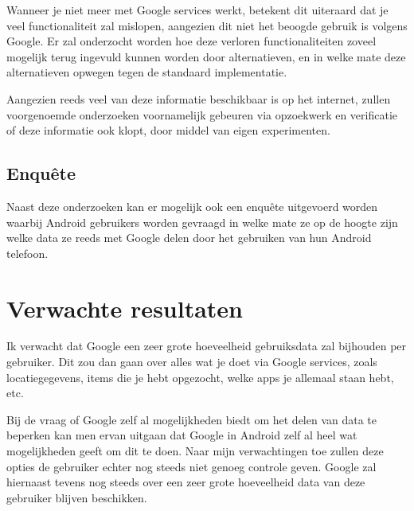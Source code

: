 \vspace{3mm}

\noindent Wanneer je niet meer met Google services werkt, betekent dit uiteraard dat je veel functionaliteit zal mislopen, aangezien dit niet het beoogde gebruik is volgens Google. Er zal onderzocht worden hoe deze verloren functionaliteiten zoveel mogelijk terug ingevuld kunnen worden door alternatieven, en in welke mate deze alternatieven opwegen tegen de standaard implementatie.

\vspace{3mm}

\noindent Aangezien reeds veel van deze informatie beschikbaar is op het internet, zullen voorgenoemde onderzoeken voornamelijk gebeuren via opzoekwerk en verificatie of deze informatie ook klopt, door middel van eigen experimenten.

\subsection{{Enquête}}

\noindent Naast deze onderzoeken kan er mogelijk ook een enquête uitgevoerd worden waarbij Android gebruikers worden gevraagd in welke mate ze op de hoogte zijn welke data ze reeds met Google delen door het gebruiken van hun Android telefoon.

\section{Verwachte resultaten}
\label{sec:verwachte_resultaten}

Ik verwacht dat Google een zeer grote hoeveelheid gebruiksdata zal bijhouden per gebruiker. Dit zou dan gaan over alles wat je doet via Google services, zoals locatiegegevens, items die je hebt opgezocht, welke apps je allemaal staan hebt, etc.

\vspace{3mm}

\noindent Bij de vraag of Google zelf al mogelijkheden biedt om het delen van data te beperken kan men ervan uitgaan dat Google in Android zelf al heel wat mogelijkheden geeft om dit te doen. Naar mijn verwachtingen toe zullen deze opties de gebruiker echter nog steeds niet genoeg controle geven. Google zal hiernaast tevens nog steeds over een zeer grote hoeveelheid data van deze gebruiker blijven beschikken.

